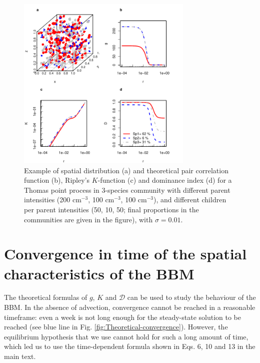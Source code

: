 \documentclass[english]{article}
\begin{document}
\begin{figure}[H]
\begin{centering}
\includegraphics[width=0.75\textwidth]{../code/figure/example_Thomas_distribution}
\par\end{centering}
\caption{Example of spatial distribution (a) and theoretical pair correlation
function (b), Ripley's $K$-function (c) and dominance index (d) for
a Thomas point process in 3-species community with different parent
intensities (200 cm$^{-3}$, 100 cm$^{-3}$, 100 cm$^{-3}$), and
different children per parent intensities (50, 10, 50; final proportions
in the communities are given in the figure), with $\sigma=0.01$.\label{fig:Example-Thomas}}
\end{figure}


\section{Convergence in time of the spatial characteristics of the BBM}

The theoretical formulas of $g$, $K$ and $\mathcal{D}$ can be used
to study the behaviour of the BBM. In the absence of advection, convergence
cannot be reached in a reasonable timeframe: even a week is not long
enough for the steady-state solution to be reached (see blue line
in Fig. \ref{fig:Theoretical-convergence}). However, the equilibrium
hypothesis that we use cannot hold for such a long amount of time,
which led us to use the time-dependent formula shown in Eqs. 6, 10
and 13 in the main text.
\end{document}
